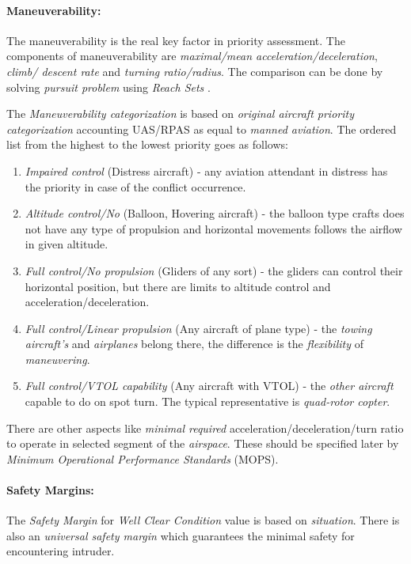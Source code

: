 \paragraph{Maneuverability:} The maneuverability is the real key factor in priority assessment.  The components of maneuverability are \emph{maximal/mean acceleration/deceleration}, \emph{climb/ descent rate} and \emph{turning ratio/radius}. The comparison can be done by solving \emph{pursuit problem} using \emph{Reach Sets} \cite{game1987,game1988}.

The \emph{Maneuverability categorization} is based on \emph{original aircraft priority categorization} \cite{icaoAnnex2} accounting UAS/RPAS as equal to \emph{manned aviation}. The ordered list from the highest to the lowest priority goes as follows:

\begin{enumerate}
    \item \emph{Impaired control} (Distress aircraft) - any aviation attendant in distress has the priority in case of the conflict occurrence.
    
    \item \emph{Altitude control/No} (Balloon, Hovering aircraft) - the balloon type crafts does not have any type of propulsion and horizontal movements follows the airflow in given altitude. 
    
    
    \item \emph{Full control/No propulsion} (Gliders of any sort) - the gliders can control their horizontal position, but there are limits to altitude control and acceleration/deceleration. 
    
    \item \emph{Full control/Linear propulsion} (Any aircraft of plane type) - the \emph{towing aircraft's} and \emph{airplanes} belong there, the difference is the \emph{flexibility} of \emph{maneuvering}.
    
    \item \emph{Full control/VTOL capability} (Any aircraft with VTOL) - the \emph{other aircraft} capable to do on spot turn. The typical representative is \emph{quad-rotor copter}.
\end{enumerate}

There are other aspects like \emph{minimal required} acceleration/deceleration/turn ratio to operate in selected segment of the \emph{airspace}. These should be specified later by \emph{Minimum Operational Performance Standards} (MOPS).

\paragraph{Safety Margins:} The \emph{Safety Margin} for \emph{Well Clear Condition} value is based on \emph{situation}. There is also an \emph{universal safety margin} which guarantees the minimal safety for encountering intruder. 

